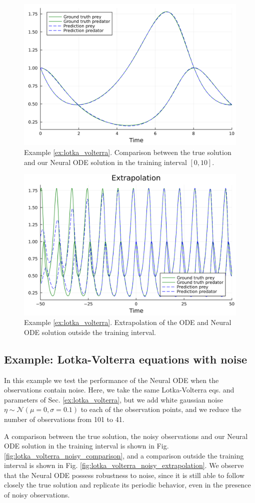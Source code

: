 \documentclass[final,onefignum,onetabnum]{siamart220329}
\newcounter{example}
\begin{document}
\begin{figure}[h!]
	\centering
	\includegraphics[width=0.5\linewidth]{../examples/lotka_volterra/comparison}
	\caption{Example \ref{ex:lotka_volterra}. Comparison between the true solution and our Neural ODE solution in the training interval $[0,10]$.}
	\label{fig:lotka_volterra_comparison}
\end{figure}

\begin{figure}[h!]
	\centering
	\includegraphics[width=0.5\linewidth]{../examples/lotka_volterra/extrapolation}
	\caption{Example \ref{ex:lotka_volterra}. Extrapolation of the ODE and Neural ODE solution outside the training interval.}
	\label{fig:lotka_volterra_extrapolation}
\end{figure}

\subsection{Example: Lotka-Volterra equations with noise}\label{ex:lotka_volterra_noisy}
In this example we test the performance of the Neural ODE when the observations contain noise. Here, we take the same Lotka-Volterra eqs. and parameters of Sec. \ref{ex:lotka_volterra}, but we add white gaussian noise $\eta\sim \mathcal{N}(\mu=0,\sigma=0.1)$ to each of the observation points, and we reduce the number of observations from 101 to 41.

A comparison between the true solution, the noisy observations and our Neural ODE solution in the training interval is shown in Fig. \ref{fig:lotka_volterra_noisy_comparison}, and a comparison outside the training interval is shown in Fig. \ref{fig:lotka_volterra_noisy_extrapolation}. We observe that the Neural ODE possess robustness to noise, since it is still able to follow closely the true solution and replicate its periodic behavior, even in the presence of noisy observations.
\end{document}
